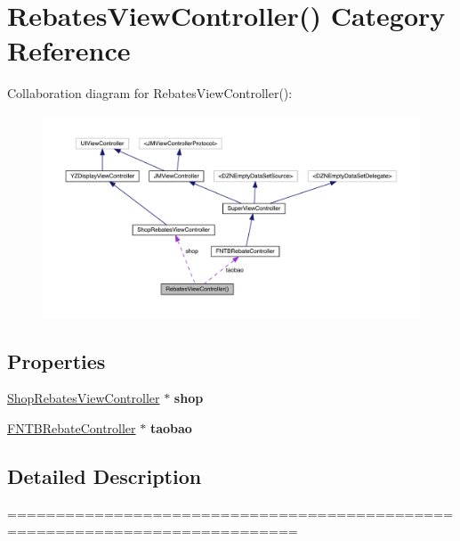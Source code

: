 \hypertarget{category_rebates_view_controller_07_08}{}\section{Rebates\+View\+Controller() Category Reference}
\label{category_rebates_view_controller_07_08}


Collaboration diagram for Rebates\+View\+Controller()\+:\nopagebreak
\begin{figure}[H]
\begin{center}
\leavevmode
\includegraphics[width=350pt]{category_rebates_view_controller_07_08__coll__graph}
\end{center}
\end{figure}
\subsection*{Properties}
\begin{DoxyCompactItemize}
\item 
\mbox{\label{category_rebates_view_controller_07_08_a2da5dfd498391fefe8bc17b65805b586}} 
\mbox{\hyperlink{interface_shop_rebates_view_controller}{Shop\+Rebates\+View\+Controller}} $\ast$ {\bfseries shop}
\item 
\mbox{\label{category_rebates_view_controller_07_08_a49eb2b6479e8e1ddb5a292185613e066}} 
\mbox{\hyperlink{interface_f_n_t_b_rebate_controller}{F\+N\+T\+B\+Rebate\+Controller}} $\ast$ {\bfseries taobao}
\end{DoxyCompactItemize}


\subsection{Detailed Description}
============================================================================

